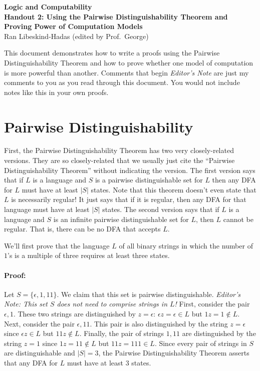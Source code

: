 \documentclass[12pt]{article}
\begin{document}
\begin{center}
    \textbf{
\large{Logic and Computability} \\
\large{Handout 2:  Using the Pairwise Distinguishability Theorem and Proving Power of Computation Models}
}\\

Ran Libeskind-Hadas (edited by Prof.\ George)\\
\end{center}

This document demonstrates how to write a proofs using the Pairwise Distinguishability Theorem and how to prove whether one model of computation is more powerful than another.  Comments that begin  \emph{Editor's Note} are just my comments to you as you read through this document.  You would not include notes like this in your own proofs.

\section{Pairwise Distinguishability}

First, the Pairwise Distinguishability Theorem has two very closely-related versions.  They are so closely-related that we usually just cite the ``Pairwise Distinguishability Theorem'' without indicating the version.  The first version says that if $L$ is a language and $S$ is a pairwise distinguishable set for $L$ then any DFA for $L$ must have at least $|S|$ states.  Note that this theorem doesn't even state that $L$ is necessarily regular!  It just says that if it is regular, then any DFA for that language must have at least $|S|$ states.  The second version says that if $L$ is a language and $S$ is an infinite pairwise distinguishable set for $L$, then $L$ cannot be regular.  That is, there can be no DFA that accepts $L$.

We'll first prove that the language $L$ of all binary strings in which the number of $1$'s is a multiple of three requires at least three states.  

\paragraph{Proof:}  Let $S =\{\epsilon, 1, 11 \}$.  We claim that this set is pairwise distinguishable.   \emph{Editor's Note:  This set $S$ does not need to comprise strings in $L$!}  First, consider the pair $\epsilon, 1$.  These two strings are distinguished by $z = \epsilon$:  $\epsilon z = \epsilon \in L$ but $1 z = 1 \notin L$.  Next, consider the pair $\epsilon, 11$.  This pair is also distinguished by the string $z= \epsilon$ since $\epsilon z \in L$ but $11 z \notin L$.  Finally, the pair of strings $1, 11$ are distinguished by the string $z = 1$ since $1z = 11 \notin L$ but $11z = 111 \in L$.  Since every pair of strings in $S$ are distinguishable and $|S| = 3$, the Pairwise Distinguishability Theorem asserts that any DFA for $L$ must have at least 3 states.
\end{document}
